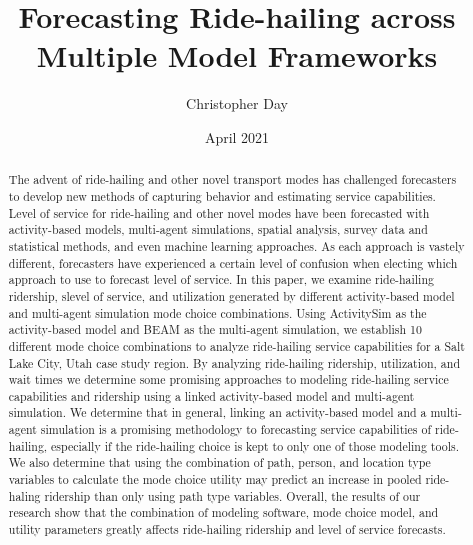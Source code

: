 \documentclass[fancy, masters]{byuthesis}
\title{Forecasting Ride-hailing across\\
\hspace*{0.333em}Multiple Model Frameworks}
\author{Christopher Day}
\date{April 2021}
\begin{document}
	\frontmatter

	\titlepage
	\clearpage

	\customtitlepage
	\clearpage


    \begin{abstract}
  The advent of ride-hailing and other novel transport modes has challenged forecasters to develop new methods of capturing behavior and estimating service capabilities. Level of service for ride-hailing and other novel modes have been forecasted with activity-based models, multi-agent simulations, spatial analysis, survey data and statistical methods, and even machine learning approaches. As each approach is vastely different, forecasters have experienced a certain level of confusion when electing which approach to use to forecast level of service. In this paper, we examine ride-hailing ridership, slevel of service, and utilization generated by different activity-based model and multi-agent simulation mode choice combinations. Using ActivitySim as the activity-based model and BEAM as the multi-agent simulation, we establish 10 different mode choice combinations to analyze ride-hailing service capabilities for a Salt Lake City, Utah case study region. By analyzing ride-hailing ridership, utilization, and wait times we determine some promising approaches to modeling ride-hailing service capabilities and ridership using a linked activity-based model and multi-agent simulation. We determine that in general, linking an activity-based model and a multi-agent simulation is a promising methodology to forecasting service capabilities of ride-hailing, especially if the ride-hailing choice is kept to only one of those modeling tools. We also determine that using the combination of path, person, and location type variables to calculate the mode choice utility may predict an increase in pooled ride-haling ridership than only using path type variables. Overall, the results of our research show that the combination of modeling software, mode choice model, and utility parameters greatly affects ride-hailing ridership and level of service forecasts.
  \end{abstract}
  	\clearpage
\end{document}
